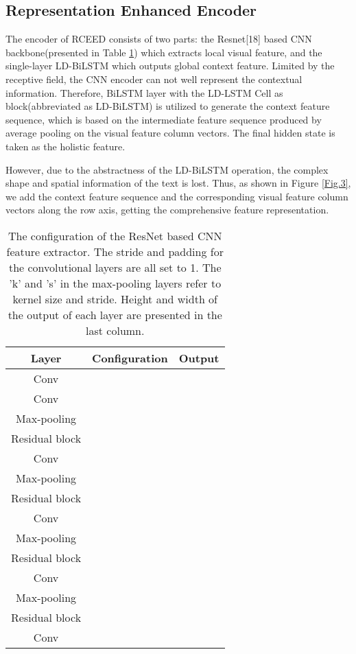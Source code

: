 \documentclass[runningheads]{llncs}
\begin{document}
\subsection{Representation Enhanced Encoder}
The encoder of RCEED consists of two parts: the Resnet[18] based CNN backbone(presented in Table \ref{tab1}) which extracts local visual feature, and the single-layer LD-BiLSTM which outputs global context feature. Limited by the receptive field, the CNN encoder can not well represent the contextual information. Therefore, BiLSTM\cite{hochreiter1997long} layer with the LD-LSTM Cell as block(abbreviated as LD-BiLSTM) is utilized to generate the context feature sequence, which is based on the intermediate feature sequence produced by average pooling on the visual feature column vectors. The final hidden state is taken as the holistic feature.

However, due to the abstractness of the LD-BiLSTM operation, the complex shape and spatial information of the text is lost. Thus, as shown in Figure \ref{Fig.3}, we add the context feature sequence and the corresponding visual feature column vectors along the row axis, getting the comprehensive feature representation. 
\begin{table}[]
\caption{The configuration of the ResNet based CNN feature extractor. The stride and padding for the convolutional layers are all set to 1. The 'k' and 's' in the max-pooling layers refer to kernel size and stride. Height and width of the output of each layer are presented in the last column.}
\label{tab1}
\centering
\begin{tabular}{c|c|c}
\hline
\textbf{Layer} & \textbf{\quad Configuration \quad} & \textbf{\quad Output \quad} \\ \hline
Conv           &                       &                \\
Conv           &                       &                \\
Max-pooling    &                       &                \\
Residual block \quad \quad &                       &                \\
Conv           &                        &                \\
Max-pooling    &                       &                \\
Residual block &                       &                \\
Conv           &                       &                \\
Max-pooling    &                       &                \\
Residual block &                       &                \\
Conv           &                       &                \\
Max-pooling    &                       &                \\
Residual block &                       &                \\
Conv           &                       &                \\ \hline
\end{tabular}
\end{table}
\end{document}
